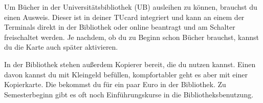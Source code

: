\begin{multicols}{2}
	Um Bücher in der Universitätsbibliothek (UB) ausleihen zu können, brauchst du einen Ausweis. Dieser ist in deiner TUcard integriert und kann an einem der Terminals direkt in der Bibliothek oder online beantragt und am Schalter freischaltet werden. Je nachdem, ob du zu Beginn schon Bücher brauchst, kannst du die Karte auch später aktivieren.

	In der Bibliothek stehen außerdem Kopierer bereit, die du nutzen kannst. Einen davon kannst du mit Kleingeld befüllen, kompfortabler geht es aber mit einer Kopierkarte. Die bekommst du für ein paar Euro in der Bibliothek. Zu Semesterbeginn gibt es oft noch Einführungskurse in die Bibliotheksbenutzung.
	
\end{multicols}
